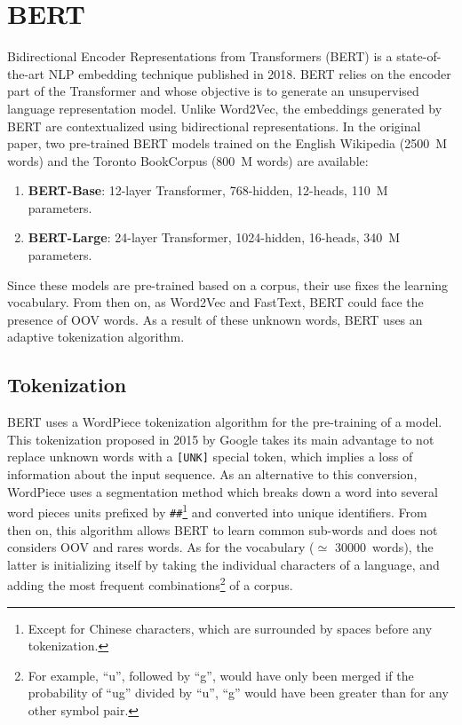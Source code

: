 
\newpage

\section{BERT}
\label{sec:bert}

Bidirectional Encoder Representations from Transformers (BERT) is a
state-of-the-art NLP embedding technique published in 2018. BERT relies on the
encoder part of the Transformer and whose objective is to generate an
unsupervised language representation model. Unlike Word2Vec, the embeddings
generated by BERT are contextualized using bidirectional representations. In the
original paper, two pre-trained BERT models trained on the English Wikipedia
(\SI{2500}{M} words) and the Toronto BookCorpus (\SI{800}{M} words) are
available:
\begin{enumerate}
\item \textbf{BERT-Base}: 12-layer Transformer, 768-hidden, 12-heads, \SI{110}{M} parameters.
\item \textbf{BERT-Large}: 24-layer Transformer, 1024-hidden, 16-heads, \SI{340}{M} parameters.
\end{enumerate}

Since these models are pre-trained based on a corpus, their use fixes the
learning vocabulary. From then on, as Word2Vec and FastText, BERT could face the
presence of OOV words. As a result of these unknown words, BERT uses an adaptive
tokenization algorithm.

\subsection{Tokenization}
\label{subsec:tokenization}

BERT uses a WordPiece tokenization algorithm for the pre-training of a
model. This tokenization proposed in 2015 by Google takes its main advantage to
not replace unknown words with a \texttt{[UNK]} special token, which implies a
loss of information about the input sequence. As an alternative to this
conversion, WordPiece uses a segmentation method which breaks down a word into
several word pieces units prefixed by \texttt{\#\#}\footnote{Except for Chinese
characters, which are surrounded by spaces before any tokenization.} and
converted into unique identifiers. From then on, this algorithm allows BERT to
learn common sub-words and does not considers OOV and rares words. As for the
vocabulary ($\simeq$ \SI{30 000}{words}), the latter is initializing itself by
taking the individual characters of a language, and adding the most frequent
combinations\footnote{For example, ``u'', followed by ``g'', would have only
been merged if the probability of ``ug'' divided by ``u'', ``g'' would have been
greater than for any other symbol pair.} of a corpus.

